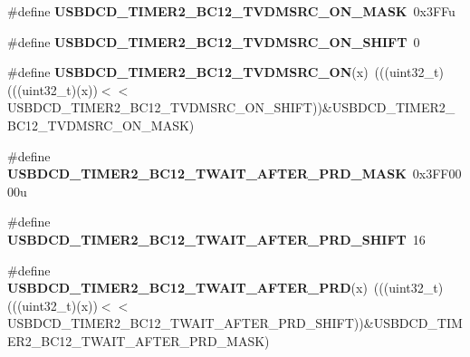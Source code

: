 \begin{DoxyCompactItemize}
\item 
\#define {\bfseries U\+S\+B\+D\+C\+D\+\_\+\+T\+I\+M\+E\+R2\+\_\+\+B\+C12\+\_\+\+T\+V\+D\+M\+S\+R\+C\+\_\+\+O\+N\+\_\+\+M\+A\+SK}~0x3\+F\+Fu\hypertarget{group__USBDCD__Register__Masks_ga81285a4c1bfeee0d9b9e093d5f3a8ba1}{}\label{group__USBDCD__Register__Masks_ga81285a4c1bfeee0d9b9e093d5f3a8ba1}

\item 
\#define {\bfseries U\+S\+B\+D\+C\+D\+\_\+\+T\+I\+M\+E\+R2\+\_\+\+B\+C12\+\_\+\+T\+V\+D\+M\+S\+R\+C\+\_\+\+O\+N\+\_\+\+S\+H\+I\+FT}~0\hypertarget{group__USBDCD__Register__Masks_ga329e3ef8c44895ed8f41db55d2fa1284}{}\label{group__USBDCD__Register__Masks_ga329e3ef8c44895ed8f41db55d2fa1284}

\item 
\#define {\bfseries U\+S\+B\+D\+C\+D\+\_\+\+T\+I\+M\+E\+R2\+\_\+\+B\+C12\+\_\+\+T\+V\+D\+M\+S\+R\+C\+\_\+\+ON}(x)~(((uint32\+\_\+t)(((uint32\+\_\+t)(x))$<$$<$U\+S\+B\+D\+C\+D\+\_\+\+T\+I\+M\+E\+R2\+\_\+\+B\+C12\+\_\+\+T\+V\+D\+M\+S\+R\+C\+\_\+\+O\+N\+\_\+\+S\+H\+I\+FT))\&U\+S\+B\+D\+C\+D\+\_\+\+T\+I\+M\+E\+R2\+\_\+\+B\+C12\+\_\+\+T\+V\+D\+M\+S\+R\+C\+\_\+\+O\+N\+\_\+\+M\+A\+SK)\hypertarget{group__USBDCD__Register__Masks_gaf91acfb039899c33d05ca22fe472cba2}{}\label{group__USBDCD__Register__Masks_gaf91acfb039899c33d05ca22fe472cba2}

\item 
\#define {\bfseries U\+S\+B\+D\+C\+D\+\_\+\+T\+I\+M\+E\+R2\+\_\+\+B\+C12\+\_\+\+T\+W\+A\+I\+T\+\_\+\+A\+F\+T\+E\+R\+\_\+\+P\+R\+D\+\_\+\+M\+A\+SK}~0x3\+F\+F0000u\hypertarget{group__USBDCD__Register__Masks_ga57bc382e906fb13b85747acdef99e068}{}\label{group__USBDCD__Register__Masks_ga57bc382e906fb13b85747acdef99e068}

\item 
\#define {\bfseries U\+S\+B\+D\+C\+D\+\_\+\+T\+I\+M\+E\+R2\+\_\+\+B\+C12\+\_\+\+T\+W\+A\+I\+T\+\_\+\+A\+F\+T\+E\+R\+\_\+\+P\+R\+D\+\_\+\+S\+H\+I\+FT}~16\hypertarget{group__USBDCD__Register__Masks_ga74ba24e1b99aacbe03cfab94267a2d5c}{}\label{group__USBDCD__Register__Masks_ga74ba24e1b99aacbe03cfab94267a2d5c}

\item 
\#define {\bfseries U\+S\+B\+D\+C\+D\+\_\+\+T\+I\+M\+E\+R2\+\_\+\+B\+C12\+\_\+\+T\+W\+A\+I\+T\+\_\+\+A\+F\+T\+E\+R\+\_\+\+P\+RD}(x)~(((uint32\+\_\+t)(((uint32\+\_\+t)(x))$<$$<$U\+S\+B\+D\+C\+D\+\_\+\+T\+I\+M\+E\+R2\+\_\+\+B\+C12\+\_\+\+T\+W\+A\+I\+T\+\_\+\+A\+F\+T\+E\+R\+\_\+\+P\+R\+D\+\_\+\+S\+H\+I\+FT))\&U\+S\+B\+D\+C\+D\+\_\+\+T\+I\+M\+E\+R2\+\_\+\+B\+C12\+\_\+\+T\+W\+A\+I\+T\+\_\+\+A\+F\+T\+E\+R\+\_\+\+P\+R\+D\+\_\+\+M\+A\+SK)\hypertarget{group__USBDCD__Register__Masks_ga0303615438e18cd52f1e19a84966b670}{}\label{group__USBDCD__Register__Masks_ga0303615438e18cd52f1e19a84966b670}


\end{DoxyCompactItemize}
